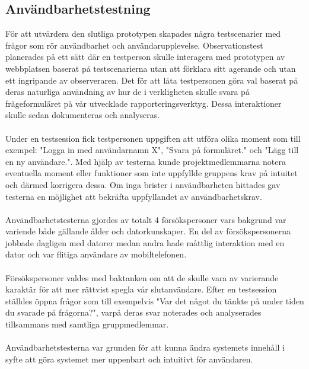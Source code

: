 \documentclass[12pt]{article}
\begin{document}
\subsection{Användbarhetstestning}
För att utvärdera den slutliga prototypen skapades några testscenarier med frågor som rör användbarhet och användarupplevelse. Observationstest planerades på ett sätt där en  testperson skulle interagera med prototypen av webbplatsen baserat på testscenarierna utan att förklara sitt agerande och utan ett ingripande av observeraren. Det för att låta testpersonen göra val baserat på deras naturliga användning av hur de i verkligheten skulle svara på frågeformuläret på vår utvecklade rapporteringsverktyg. Dessa interaktioner skulle sedan dokumenteras och  analyseras.\\\\
Under en testsession fick testpersonen uppgiften att utföra olika moment som till exempel: "Logga in med användarnamn X", "Svara på formuläret." och "Lägg till en ny användare.". Med hjälp av testerna kunde projektmedlemmarna notera eventuella moment eller funktioner som inte uppfyllde gruppens krav på intuitet och därmed korrigera dessa. Om inga brister i användbarheten hittades gav testerna en möjlighet att bekräfta uppfyllandet av användbarhetskrav.\\\\
Användbarhetstesterna gjordes av totalt 4 försökspersoner vars bakgrund var variende både gällande ålder och datorkunskaper. En del av försökspersonerna jobbade dagligen med datorer medan andra hade måttlig interaktion med en dator och var flitiga användare av mobiltelefonen. \\\\
Försökspersoner valdes med baktanken om att de skulle vara av varierande karaktär för att mer rättvist spegla vår slutanvändare. Efter en testsession ställdes öppna frågor som till exempelvis "Var det något du tänkte på under tiden du svarade på frågorna?", varpå deras svar noterades och analyserades tillsammans med samtliga gruppmedlemmar.\\\\
Användbarhetstesterna var grunden för att kunna ändra systemets innehåll i syfte att göra systemet mer uppenbart och intuitivt för användaren.
\end{document}
